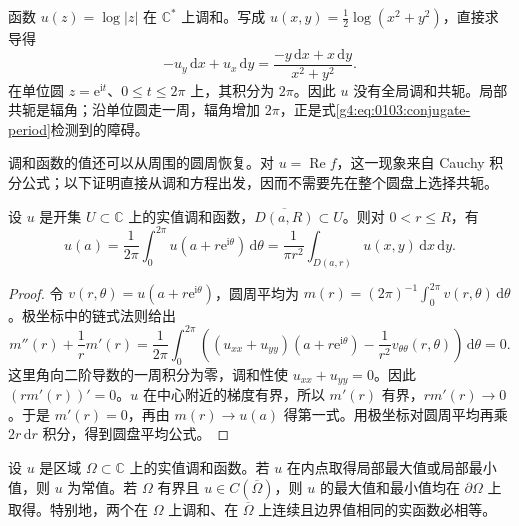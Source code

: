 \begin{example}
	\label{g4:exm:0103:log-modulus}
	函数 \(u(z)=\log\lvert z\rvert\) 在 \(\mathbb C^*\) 上调和。写成 \(u(x,y)=\tfrac12\log(x^2+y^2)\)，直接求导得
	\[
		-u_y\,\mathrm{d}x+u_x\,\mathrm{d}y
		=\frac{-y\,\mathrm{d}x+x\,\mathrm{d}y}{x^2+y^2}.
	\]
	在单位圆 \(z=\mathrm{e}^{\mathrm{i}t}\)、\(0\leq t\leq2\pi\) 上，其积分为 \(2\pi\)。因此 \(u\) 没有全局调和共轭。局部共轭是辐角；沿单位圆走一周，辐角增加 \(2\pi\)，正是式\eqref{g4:eq:0103:conjugate-period}检测到的障碍。
\end{example}

调和函数的值还可以从周围的圆周恢复。对 \(u=\operatorname{Re}f\)，这一现象来自 Cauchy 积分公式；以下证明直接从调和方程出发，因而不需要先在整个圆盘上选择共轭。

\begin{proposition}[调和函数的平均值性质]
	\label{g4:prop:0103:harmonic-mean}
	设 \(u\) 是开集 \(U\subset\mathbb C\) 上的实值调和函数，\(\overline{D(a,R)}\subset U\)。则对 \(0<r\leq R\)，有
	\[
		u(a)=\frac1{2\pi}\int_0^{2\pi}u(a+r\mathrm{e}^{\mathrm{i}\theta})\,\mathrm{d}\theta
		=\frac1{\pi r^2}\int_{D(a,r)}u(x,y)\,\mathrm{d}x\,\mathrm{d}y.
	\]
\end{proposition}

\begin{proof}
	令 \(v(r,\theta)=u(a+r\mathrm{e}^{\mathrm{i}\theta})\)，圆周平均为 \(m(r)=(2\pi)^{-1}\int_0^{2\pi}v(r,\theta)\,\mathrm{d}\theta\)。极坐标中的链式法则给出
	\[
		m''(r)+\frac1r m'(r)
		=\frac1{2\pi}\int_0^{2\pi}
		\left((u_{xx}+u_{yy})(a+r\mathrm{e}^{\mathrm{i}\theta})
		-\frac1{r^2}v_{\theta\theta}(r,\theta)\right)
		\,\mathrm{d}\theta=0.
	\]
	这里角向二阶导数的一周积分为零，调和性使 \(u_{xx}+u_{yy}=0\)。因此 \((rm'(r))'=0\)。\(u\) 在中心附近的梯度有界，所以 \(m'(r)\) 有界，\(rm'(r)\rightarrow0\)。于是 \(m'(r)=0\)，再由 \(m(r)\rightarrow u(a)\) 得第一式。用极坐标对圆周平均再乘 \(2r\,\mathrm{d}r\) 积分，得到圆盘平均公式。
\end{proof}

\begin{corollary}[调和函数的极值原理]
	\label{g4:cor:0103:harmonic-maximum}
	设 \(u\) 是区域 \(\Omega\subset\mathbb C\) 上的实值调和函数。若 \(u\) 在内点取得局部最大值或局部最小值，则 \(u\) 为常值。若 \(\Omega\) 有界且 \(u\in C(\overline\Omega)\)，则 \(u\) 的最大值和最小值均在 \(\partial\Omega\) 上取得。特别地，两个在 \(\Omega\) 上调和、在 \(\overline\Omega\) 上连续且边界值相同的实函数必相等。
\end{corollary}


